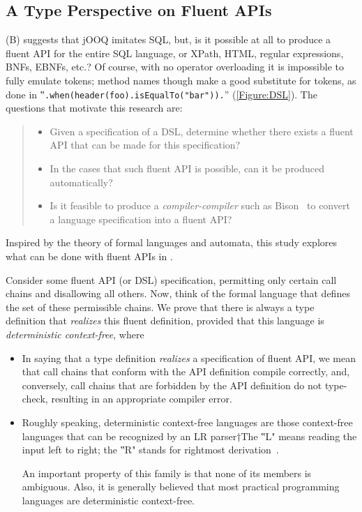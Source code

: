 \subsection{A Type Perspective on Fluent APIs}
(B) suggests that jOOQ imitates SQL,
but, is it possible at all to produce a fluent API
for the entire SQL language,
or XPath, HTML, regular expressions, BNFs, EBNFs, etc.?
Of course, with no operator overloading it is impossible
to fully emulate tokens; method names though make a good substitute for tokens, as done
in ‟\lstinline{.when(header(foo).isEqualTo("bar")).}” (\cref{Figure:DSL}).
The questions that motivate this research are:
\begin{quote}
  \begin{itemize}
    \item Given a specification of a DSL, determine whether there exists
        a fluent API that can be made for this specification?
    \item In the cases that such fluent API is possible,
      can it be produced automatically?
    \item Is it feasible to produce a \emph{compiler-compiler} such as Bison~\cite{Bison:manual}
        to convert a language specification into a fluent API?
\end{itemize}
\end{quote}

Inspired by the theory of formal languages and automata,
  this study explores what can be done with fluent APIs in \Java.

Consider some fluent API (or DSL) specification, permitting only certain call
chains and disallowing all others.
Now, think of the formal language that defines the set of these permissible chains.
We prove that there is always a \Java type definition that
  \emph{realizes} this fluent definition, provided that this
  language is \emph{deterministic context-free}, where
\begin{itemize}
  \item In saying that a type definition \emph{realizes} a specification of fluent
    API, we mean that call chains that conform with the API definition compile
    correctly, and, conversely, call chains that are forbidden by the API
    definition do not type-check, resulting in an appropriate compiler error.
  \item Roughly speaking, deterministic context-free languages are those
    context-free languages that can be recognized by an LR parser†{The ‟L"
    means reading the input left to right; the ‟R" stands for rightmost derivation}~\cite{Aho:Sethi:Ullman:86}.
    \par
    An important property of this family is that none of its members is ambiguous.
    Also, it is generally believed that most practical programming languages
    are deterministic context-free.
\end{itemize}

